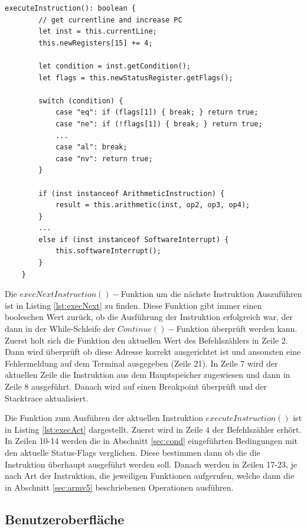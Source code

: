 \documentclass[a4paper, 11pt, onecolumn]{article}
\begin{document}
\begin{lstlisting}[style=JavaScript, basicstyle=\footnotesize, backgroundcolor=\color{backcolour}, caption={Funktion zum Ausführen der aktuellen Instruktion je nach Art der Instruktion}, captionpos=b, label={lst:execAct}]
executeInstruction(): boolean {
        // get currentline and increase PC
        let inst = this.currentLine;
        this.newRegisters[15] += 4;

        let condition = inst.getCondition();
        let flags = this.newStatusRegister.getFlags();

        switch (condition) {
            case "eq": if (flags[1]) { break; } return true;
            case "ne": if (!flags[1]) { break; } return true;
            ...
            case "al": break;
            case "nv": return true;
        }
        
        if (inst instanceof ArithmeticInstruction) {
        	result = this.arithmetic(inst, op2, op3, op4);
        }
        ...
        else if (inst instanceof SoftwareInterrupt) {
            this.softwareInterrupt();
        }
    }
\end{lstlisting}

Die $execNextInstruction()-$Funktion um die nächste Instruktion Auszuführen ist in Listing \ref{lst:execNext} zu finden. Diese Funktion gibt immer einen booleschen Wert zurück, ob die Ausführung der Instruktion erfolgreich war, der dann in der While-Schleife der $Continue()-$Funktion überprüft werden kann. Zuerst holt sich die Funktion den aktuellen Wert des Befehlszählers in Zeile 2. Dann wird überprüft ob diese Adresse korrekt ausgerichtet ist und ansonsten eine Fehlermeldung auf dem Terminal ausgegeben (Zeile 21). In Zeile 7 wird der aktuellen Zeile die Instruktion aus dem Hauptspeicher zugewiesen und dann in Zeile 8 ausgeführt. Danach wird auf einen Breakpoint überprüft und der Stacktrace aktualisiert.

Die Funktion zum Ausführen der aktuellen Instruktion $executeInstruction()$ ist in Listing \ref{lst:execAct} dargestellt. Zuerst wird in Zeile 4 der Befehlszähler erhört. In Zeilen 10-14 werden die in Abschnitt \ref{sec:cond} eingeführten Bedingungen mit den aktuelle Status-Flags verglichen. Diese bestimmen dann ob die die Instruktion überhaupt ausgeführt werden soll. Danach werden in Zeilen 17-23, je nach Art der Instruktion, die jeweiligen Funktionen aufgerufen, welche dann die in Abschnitt \ref{sec:armv5} beschriebenen Operationen ausführen.

\subsection{Benutzeroberfläche}
\end{document}
